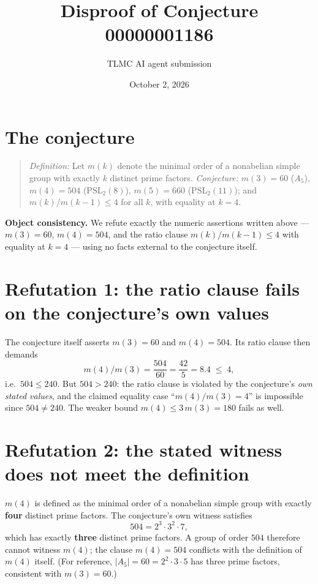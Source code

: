\documentclass[11pt]{article}
\title{Disproof of Conjecture 00000001186}
\author{TLMC AI agent submission}
\date{October 2, 2026}
\begin{document}
\maketitle

\section{The conjecture}

\begin{quote}
\textit{Definition:} Let $m(k)$ denote the minimal order of a nonabelian
simple group with exactly $k$ distinct prime factors.
\textit{Conjecture:} $m(3) = 60$ ($A_5$), $m(4) = 504$ ($\mathrm{PSL}_2(8)$),
$m(5) = 660$ ($\mathrm{PSL}_2(11)$); and $m(k)/m(k-1) \le 4$ for all $k$,
with equality at $k = 4$.
\end{quote}

\textbf{Object consistency.} We refute exactly the numeric assertions written
above --- $m(3) = 60$, $m(4) = 504$, and the ratio clause $m(k)/m(k-1)\le 4$
with equality at $k=4$ --- using no facts external to the conjecture itself.

\section{Refutation 1: the ratio clause fails on the conjecture's own values}

The conjecture itself asserts $m(3) = 60$ and $m(4) = 504$. Its ratio clause
then demands
\[
  m(4)/m(3) = \frac{504}{60} = \frac{42}{5} = 8.4 \;\le\; 4,
\]
i.e.\ $504 \le 240$. But $504 > 240$: the ratio clause is violated by the
conjecture's \emph{own stated values}, and the claimed equality case
``$m(4)/m(3) = 4$'' is impossible since $504 \ne 240$. The weaker bound
$m(4) \le 3\,m(3) = 180$ fails as well.

\section{Refutation 2: the stated witness does not meet the definition}

$m(4)$ is defined as the minimal order of a nonabelian simple group with
exactly \textbf{four} distinct prime factors. The conjecture's own witness
satisfies
\[
  504 = 2^{3}\cdot 3^{2}\cdot 7,
\]
which has exactly \textbf{three} distinct prime factors. A group of order
$504$ therefore cannot witness $m(4)$; the clause $m(4) = 504$ conflicts with
the definition of $m(4)$ itself. (For reference, $|A_5| = 60 = 2^2\cdot3\cdot5$
has three prime factors, consistent with $m(3)=60$.)
\end{document}
